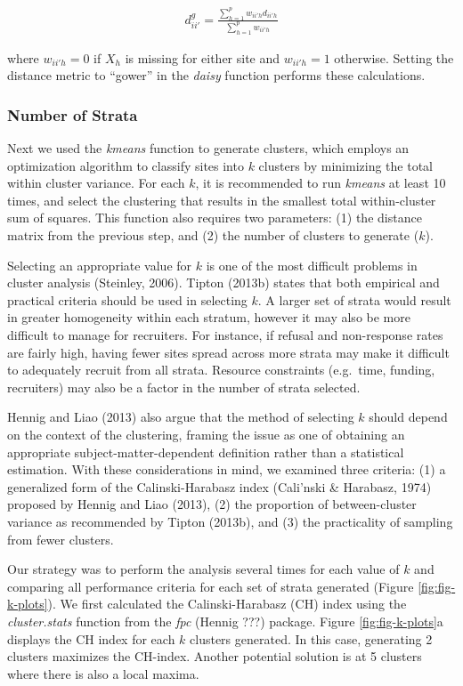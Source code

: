 \documentclass[man,floatsintext]{apa6}
\begin{document}
\begin{align}
  d^{g}_{ii'} = \frac{\sum^p_{h = 1}w_{ii'h}d_{ii'h}}{\sum^p_{h = 1}w_{ii'h}}
\end{align}

where \(w_{ii'h} = 0\) if \(X_h\) is missing for either site and \(w_{ii'h} = 1\) otherwise. Setting the distance metric to \enquote{gower} in the \emph{daisy} function performs these calculations.

\hypertarget{number-of-strata}{%
\subsubsection{Number of Strata}\label{number-of-strata}}

Next we used the \emph{kmeans} function to generate clusters, which employs an optimization algorithm to classify sites into \(k\) clusters by minimizing the total within cluster variance. For each \(k\), it is recommended to run \emph{kmeans} at least 10 times, and select the clustering that results in the smallest total within-cluster sum of squares. This function also requires two parameters: (1) the distance matrix from the previous step, and (2) the number of clusters to generate (\(k\)).

Selecting an appropriate value for \(k\) is one of the most difficult problems in cluster analysis (Steinley, 2006). Tipton (2013b) states that both empirical and practical criteria should be used in selecting \(k\). A larger set of strata would result in greater homogeneity within each stratum, however it may also be more difficult to manage for recruiters. For instance, if refusal and non-response rates are fairly high, having fewer sites spread across more strata may make it difficult to adequately recruit from all strata. Resource constraints (e.g.~time, funding, recruiters) may also be a factor in the number of strata selected.

Hennig and Liao (2013) also argue that the method of selecting \(k\) should depend on the context of the clustering, framing the issue as one of obtaining an appropriate subject-matter-dependent definition rather than a statistical estimation. With these considerations in mind, we examined three criteria: (1) a generalized form of the Calinski-Harabasz index (Cali\a'nski \& Harabasz, 1974) proposed by Hennig and Liao (2013), (2) the proportion of between-cluster variance as recommended by Tipton (2013b), and (3) the practicality of sampling from fewer clusters.

Our strategy was to perform the analysis several times for each value of \(k\) and comparing all performance criteria for each set of strata generated (Figure \ref{fig:fig-k-plots}). We first calculated the Calinski-Harabasz (CH) index using the \emph{cluster.stats} function from the \emph{fpc} (Hennig ???) package. Figure \ref{fig:fig-k-plots}a displays the CH index for each \(k\) clusters generated. In this case, generating 2 clusters maximizes the CH-index. Another potential solution is at 5 clusters where there is also a local maxima.
\end{document}
